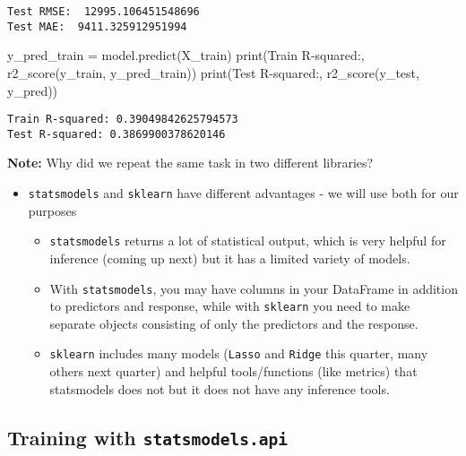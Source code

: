 \documentclass[
  letterpaper,
  DIV=11,
  numbers=noendperiod]{scrreprt}
\newenvironment{Shaded}{\begin{snugshade}}{\end{snugshade}}
\newcommand{\BuiltInTok}[1]{\textcolor[rgb]{0.00,0.23,0.31}{#1}}
\newcommand{\NormalTok}[1]{\textcolor[rgb]{0.00,0.23,0.31}{#1}}
\newcommand{\OperatorTok}[1]{\textcolor[rgb]{0.37,0.37,0.37}{#1}}
\newcommand{\StringTok}[1]{\textcolor[rgb]{0.13,0.47,0.30}{#1}}
\providecommand{\tightlist}{%
  \setlength{\itemsep}{0pt}\setlength{\parskip}{0pt}}\usepackage{longtable,booktabs,array}
\begin{document}
\begin{verbatim}
Test RMSE:  12995.106451548696
Test MAE:  9411.325912951994
\end{verbatim}

\begin{Shaded}
\begin{Highlighting}[]
\NormalTok{y\_pred\_train }\OperatorTok{=}\NormalTok{ model.predict(X\_train)}
\BuiltInTok{print}\NormalTok{(}\StringTok{\textquotesingle{}Train R{-}squared:\textquotesingle{}}\NormalTok{, r2\_score(y\_train, y\_pred\_train))}
\BuiltInTok{print}\NormalTok{(}\StringTok{\textquotesingle{}Test R{-}squared:\textquotesingle{}}\NormalTok{, r2\_score(y\_test, y\_pred))}
\end{Highlighting}
\end{Shaded}

\begin{verbatim}
Train R-squared: 0.39049842625794573
Test R-squared: 0.3869900378620146
\end{verbatim}

\textbf{Note:} Why did we repeat the same task in two different
libraries?

\begin{itemize}
\tightlist
\item
  \texttt{statsmodels} and \texttt{sklearn} have different advantages -
  we will use both for our purposes

  \begin{itemize}
  \tightlist
  \item
    \texttt{statsmodels} returns a lot of statistical output, which is
    very helpful for inference (coming up next) but it has a limited
    variety of models.
  \item
    With \texttt{statsmodels}, you may have columns in your DataFrame in
    addition to predictors and response, while with \texttt{sklearn} you
    need to make separate objects consisting of only the predictors and
    the response.
  \item
    \texttt{sklearn} includes many models (\texttt{Lasso} and
    \texttt{Ridge} this quarter, many others next quarter) and helpful
    tools/functions (like metrics) that statsmodels does not but it does
    not have any inference tools.
  \end{itemize}
\end{itemize}

\subsection{\texorpdfstring{Training with
\texttt{statsmodels.api}}{Training with statsmodels.api}}\label{training-with-statsmodels.api}
\end{document}

